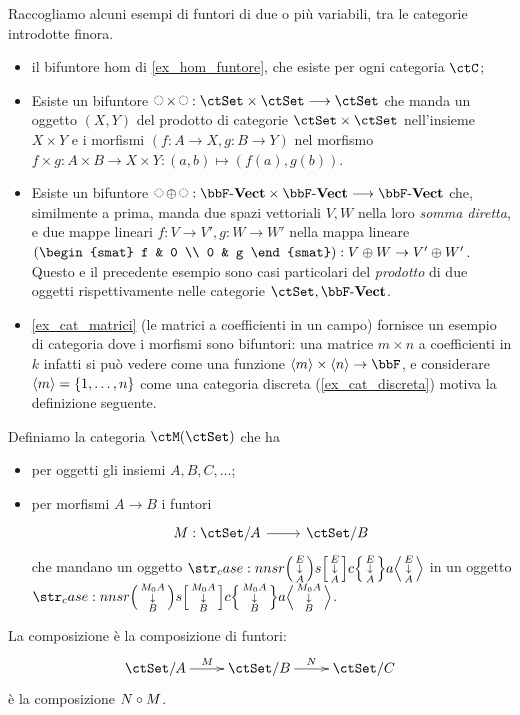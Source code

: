 \begin{examples}\label{exam_bifuntori}
	Raccogliamo alcuni esempi di funtori di due o più variabili, tra le categorie introdotte finora.
	\begin{itemize}
		\item il bifuntore hom di \ref{ex_hom_funtore}, che esiste per ogni categoria \(\ctC\);
		\item Esiste un bifuntore \(\blank\times\blank : \ctSet\times\ctSet \fun\ctSet\) che manda un oggetto \((X,Y)\) del prodotto di categorie \(\ctSet\times\ctSet\) nell'insieme \(X\times Y\) e i morfismi \((f :A \to X, g : B\to Y)\) nel morfismo \(f\times g : A\times B \to X\times Y : (a,b)\mapsto (f(a),g(b))\).
		\item Esiste un bifuntore \(\blank\oplus\blank : \ctVect\times\ctVect \fun\ctVect\) che, similmente a prima, manda due spazi vettoriali \(V,W\) nella loro \emph{somma diretta}, e due mappe lineari \(f : V\to V',g : W\to W'\) nella mappa lineare \(\left(\begin{smat} f & 0 \\ 0 & g \end{smat}\right) : V\oplus W \to V'\oplus W'\). Questo e il precedente esempio sono casi particolari del \emph{prodotto} di due oggetti rispettivamente nelle categorie \(\ctSet,\ctVect\).
		\item \ref{ex_cat_matrici} (le matrici a coefficienti in un campo) fornisce un esempio di categoria dove i morfismi sono bifuntori: una matrice \(m\times n\) a coefficienti in \(k\) infatti si può vedere come una funzione \(\bkt m\times \bkt n \to \bbF\), e considerare \(\bkt m = \{\iter n\}\) come una categoria discreta (\ref{ex_cat_discreta}) motiva la definizione seguente.
	\end{itemize}
\end{examples}
\begin{definition}
	Definiamo la categoria \(\ctM(\ctSet)\) che ha
	\begin{itemize}
		\item per oggetti gli insiemi \(A,B,C,\dots\);
		\item per morfismi \(A\to B\) i funtori
		      \[\dmFun M{\ctSet/A}{\ctSet/B}\]
		      che mandano un oggetto \(\var EA\) in un oggetto \(\var{M_0A}B\).
	\end{itemize}
	La composizione è la composizione di funtori:
	\[\xymatrix{
			\ctSet/A \ar[r]^M & \ctSet/B \ar[r]^N & \ctSet/C
		}\]
	è la composizione \(N\circ M\).
\end{definition}
